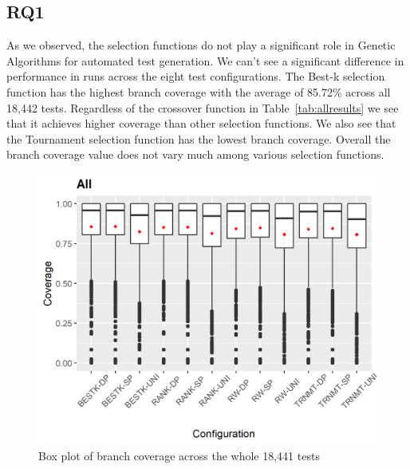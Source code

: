 \documentclass[sigconf]{acmart}
\begin{document}
\subsection{RQ1}
As we observed, the selection functions do not play a significant role in Genetic Algorithms for automated 
test generation. We can't see a significant difference in performance in runs across the eight test configurations.
The Best-k selection function has the highest branch coverage with the average of 85.72\% across all 18,442 tests.
Regardless of the crossover function in Table~\ref{tab:allresults} we see that it achieves higher coverage than 
other selection functions. We also see that the Tournament selection function has the lowest branch coverage.
Overall the branch coverage value does not vary much among various selection functions.

\begin{figure}[b]
  \centering
  \includegraphics[width=\linewidth]{../output/all-boxplot.png}
  \caption{Box plot of branch coverage across the whole 18,441 tests}
  \label{fig:allboxplot}
\end{figure}
\end{document}
